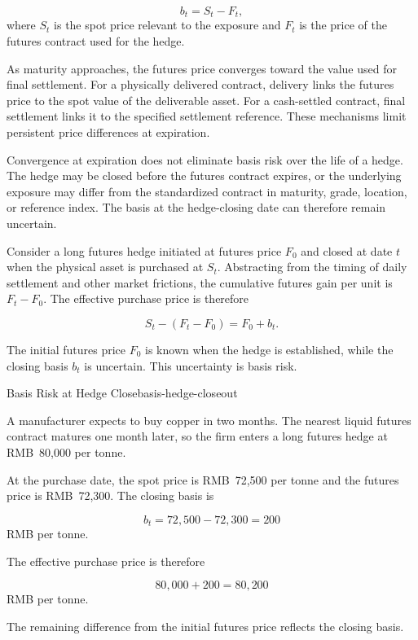 \begin{equation}
b_t=S_t-F_t,
\label{eq:ch17-futures-basis}
\end{equation}
where $S_t$ is the spot price relevant to the exposure and $F_t$ is the price of the futures contract used for the hedge.

As maturity approaches, the futures price converges toward the value used for final settlement. For a physically delivered contract, delivery links the futures price to the spot value of the deliverable asset. For a cash-settled contract, final settlement links it to the specified settlement reference. These mechanisms limit persistent price differences at expiration.

Convergence at expiration does not eliminate basis risk over the life of a hedge. The hedge may be closed before the futures contract expires, or the underlying exposure may differ from the standardized contract in maturity, grade, location, or reference index. The basis at the hedge-closing date can therefore remain uncertain.

Consider a long futures hedge initiated at futures price $F_0$ and closed at date $t$ when the physical asset is purchased at $S_t$. Abstracting from the timing of daily settlement and other market frictions, the cumulative futures gain per unit is $F_t-F_0$. The effective purchase price is therefore

\begin{equation}
S_t-(F_t-F_0)
=F_0+b_t.
\label{eq:ch17-effective-long-hedge-price}
\end{equation}

The initial futures price $F_0$ is known when the hedge is established, while the closing basis $b_t$ is uncertain. This uncertainty is basis risk.

\begin{example}{Basis Risk at Hedge Close}{basis-hedge-closeout}

A manufacturer expects to buy copper in two months. The nearest liquid futures contract matures one month later, so the firm enters a long futures hedge at RMB~80,000 per tonne.

At the purchase date, the spot price is RMB~72,500 per tonne and the futures price is RMB~72,300. The closing basis is

\[
b_t=72{,}500-72{,}300=200
\]
RMB per tonne.

The effective purchase price is therefore

\[
80{,}000+200=80{,}200
\]
RMB per tonne.

The remaining difference from the initial futures price reflects the closing basis.

\end{example}


